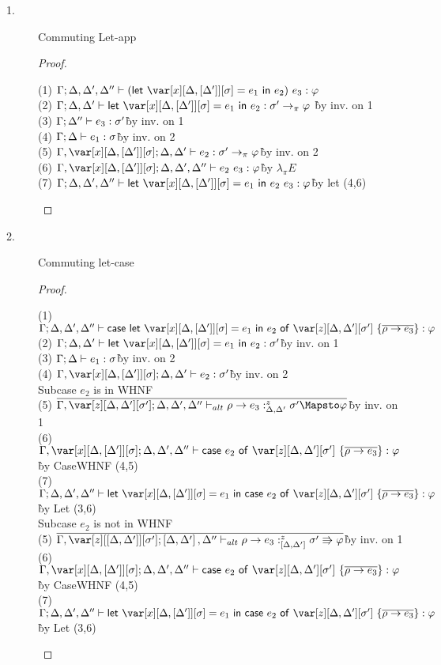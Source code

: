 \begin{description}
\item[1.] Commuting Let-app
\begin{proof}~
\begin{tabbing}
    (1) $\G; \D, \D', \D'' \vdash (\llet{\xD = e_1}{e_2})~e_3 : \vp$\\
    (2) $\G; \D, \D' \vdash \llet{\xD = e_1}{e_2} : \s' \to_\pi \vp$ \`by inv. on 1\\
    (3) $\Gamma; \Delta'' \vdash e_3 : \sigma'$\`by inv. on 1\\
    (4) $\Gamma; \Delta \vdash e_1 : \sigma$\`by inv. on 2\\
    (5) $\G, \xD; \D, \D' \vdash e_2 : \s' \to_\pi \vp$\`by inv. on 2\\
    (6) $\G, \xD; \D, \D', \D'' \vdash e_2~e_3 : \vp$\` by $\lambda_\pi E$\\
    (7) $\G; \D, \D', \D'' \vdash \llet{\xD = e_1}{e_2~e_3} : \vp$\`by let (4,6)\\
\end{tabbing}
\end{proof}

\item[2.] Commuting let-case
\begin{proof}~
\begin{tabbing}
    (1) $\G; \D, \D', \D'' \vdash \ccase{\llet{\xD = e_1}{e_2}}{\z[\D,\D'][\s']~\{\ov{\rho \to e_3}\}} : \vp$\\
    (2) $\G; \D, \D' \vdash \llet{\xD = e_1}{e_2} : \s'$\`by inv. on 1\\
    (3) $\Gamma; \Delta \vdash e_1 : \sigma$\`by inv. on 2\\
    (4) $\G, \xD;\D,\D' \vdash e_2 : \s'$\`by inv. on 2\\
    Subcase $e_2$ is in WHNF\\
    (5) $\ov{\G,\z[\D,\D'][\s']; \D, \D', \D'' \vdash_{alt} \rho \to e_3 :^z_{\D,\D'} \s' \Mapsto \vp}$\`by inv. on 1\\
    (6) $\G, \xD; \D, \D', \D'' \vdash \ccase{e_2}{\z[\D,\D'][\s']~\{\ov{\rho \to e_3}\}} : \vp$\`by CaseWHNF (4,5)\\
    (7) $\G; \D, \D', \D'' \vdash \llet{\xD = e_1}{\ccase{e_2}{\z[\D,\D'][\s']~\{\ov{\rho \to e_3}\}}} : \vp$\`by Let (3,6)\\
    Subcase $e_2$ is not in WHNF\\
    (5) $\ov{\G,\z[\irr{\D,\D'}][\s']; \irr{\D, \D'}, \D'' \vdash_{alt} \rho \to e_3 :^z_{\irr{\D,\D'}} \s' \Rrightarrow \vp}$\`by inv. on 1\\
    (6) $\G, \xD; \D, \D', \D'' \vdash \ccase{e_2}{\z[\D,\D'][\s']~\{\ov{\rho \to e_3}\}} : \vp$\`by CaseWHNF (4,5)\\
    (7) $\G; \D, \D', \D'' \vdash \llet{\xD = e_1}{\ccase{e_2}{\z[\D,\D'][\s']~\{\ov{\rho \to e_3}\}}} : \vp$\`by Let (3,6)\\
\end{tabbing}
\end{proof}


\end{description}
